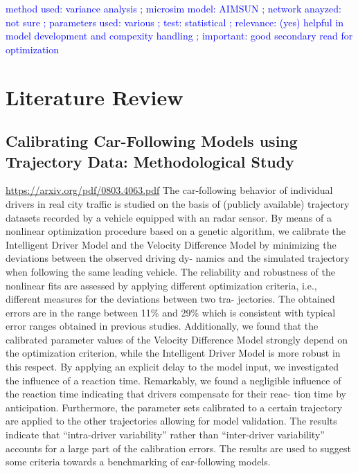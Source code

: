 \documentclass{article}
\begin{document}
\textcolor{blue}{\cite{paramsCalib} method used: variance analysis ; microsim model: AIMSUN ; network anayzed: not sure ; parameters used: various ; test: statistical ; relevance: (yes) helpful in model development and compexity handling ; important: good secondary read for optimization}



\section*{Literature Review}
\subsection*{Calibrating Car-Following Models using Trajectory Data: Methodological Study  \label{}}
\url{https://arxiv.org/pdf/0803.4063.pdf}
The car-following behavior of individual drivers in real city traffic is studied on the basis of (publicly available) trajectory datasets recorded by a vehicle equipped with an radar sensor. By means of a nonlinear optimization procedure based on a genetic algorithm, we calibrate the Intelligent Driver Model and the Velocity Difference Model by minimizing the deviations between the observed driving dy- namics and the simulated trajectory when following the same leading vehicle. The reliability and robustness of the nonlinear fits are assessed by applying different optimization criteria, i.e., different measures for the deviations between two tra- jectories. The obtained errors are in the range between 11\% and 29\% which is consistent with typical error ranges obtained in previous studies. Additionally, we found that the calibrated parameter values of the Velocity Difference Model strongly depend on the optimization criterion, while the Intelligent Driver Model is more robust in this respect. By applying an explicit delay to the model input, we investigated the influence of a reaction time. Remarkably, we found a negligible influence of the reaction time indicating that drivers compensate for their reac- tion time by anticipation. Furthermore, the parameter sets calibrated to a certain trajectory are applied to the other trajectories allowing for model validation. The results indicate that “intra-driver variability” rather than “inter-driver variability” accounts for a large part of the calibration errors. The results are used to suggest some criteria towards a benchmarking of car-following models.
\end{document}
